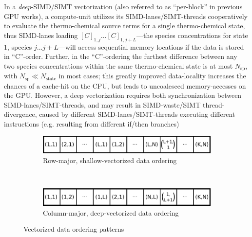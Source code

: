 \documentclass[12pt,number,sort&compress,preprint]{elsarticle}
\begin{document}
In a \textit{deep}-SIMD\slash SIMT vectorization (also referred to as ``per-block'' in previous GPU works), a compute-unit utilizes its SIMD-lanes\slash SIMT-threads cooperatively to evaluate the thermo-chemical source terms for a single thermo-chemical state, thus SIMD-lanes loading $[C]_{1, j} \ldots [C]_{1, j + L}$---the species concentrations for state 1, species $j \ldots j + L$---will access sequential memory locations if the data is stored in ``C''-order.
Further, in the ``C''-ordering the furthest difference between any two species concentrations within the same thermo-chemical state is at most $N_{\text{sp}}$, with $N_{\text{sp}} \ll N_{\text{state}}$ in most cases; this greatly improved data-locality increases the chances of a cache-hit on the CPU, but leads to uncoalesced memory-accesses on the GPU.
However, a deep vectorization requires both synchronization between SIMD-lanes\slash SIMT-threads, and may result in SIMD-waste\slash SIMT thread-divergence, caused by different SIMD-lanes\slash SIMT-threads executing different instructions (e.g. resulting from different if\slash then branches)

\begin{figure}[htb]
  \centering
  \begin{minipage}{0.6\linewidth}
    \begin{subfigure}[t]{\textwidth}
	\includegraphics[width=\textwidth]{row_major_split.pdf}
	\caption{Row-major, shallow-vectorized data ordering}
	\label{F:row_major_split}
    \end{subfigure}
    \\
    \begin{subfigure}[t]{\textwidth}
	\includegraphics[width=\textwidth]{column_major_split.pdf}
	\caption{Column-major, deep-vectorized data ordering}
	\label{F:column_major_split}
    \end{subfigure}
  \end{minipage}
  \caption{Vectorized data ordering patterns}
  \label{F:vector_data}
\end{figure}
\end{document}
